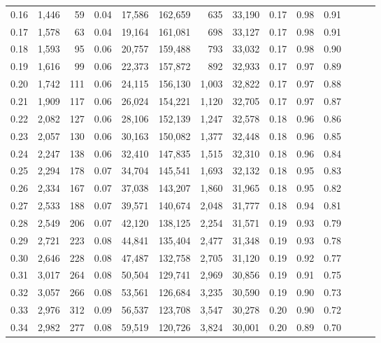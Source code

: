 \begin{tabular}{rrrrrrrrrrrrrr}
0.16 &  1,446 &   59 &  0.04 &   17,586 &  162,659 &     635 &  33,190 &  0.17 &  0.98 &      0.91 \\
0.17 &  1,578 &   63 &  0.04 &   19,164 &  161,081 &     698 &  33,127 &  0.17 &  0.98 &      0.91 \\
0.18 &  1,593 &   95 &  0.06 &   20,757 &  159,488 &     793 &  33,032 &  0.17 &  0.98 &      0.90 \\
0.19 &  1,616 &   99 &  0.06 &   22,373 &  157,872 &     892 &  32,933 &  0.17 &  0.97 &      0.89 \\
0.20 &  1,742 &  111 &  0.06 &   24,115 &  156,130 &   1,003 &  32,822 &  0.17 &  0.97 &      0.88 \\
0.21 &  1,909 &  117 &  0.06 &   26,024 &  154,221 &   1,120 &  32,705 &  0.17 &  0.97 &      0.87 \\
0.22 &  2,082 &  127 &  0.06 &   28,106 &  152,139 &   1,247 &  32,578 &  0.18 &  0.96 &      0.86 \\
0.23 &  2,057 &  130 &  0.06 &   30,163 &  150,082 &   1,377 &  32,448 &  0.18 &  0.96 &      0.85 \\
0.24 &  2,247 &  138 &  0.06 &   32,410 &  147,835 &   1,515 &  32,310 &  0.18 &  0.96 &      0.84 \\
0.25 &  2,294 &  178 &  0.07 &   34,704 &  145,541 &   1,693 &  32,132 &  0.18 &  0.95 &      0.83 \\
0.26 &  2,334 &  167 &  0.07 &   37,038 &  143,207 &   1,860 &  31,965 &  0.18 &  0.95 &      0.82 \\
0.27 &  2,533 &  188 &  0.07 &   39,571 &  140,674 &   2,048 &  31,777 &  0.18 &  0.94 &      0.81 \\
0.28 &  2,549 &  206 &  0.07 &   42,120 &  138,125 &   2,254 &  31,571 &  0.19 &  0.93 &      0.79 \\
0.29 &  2,721 &  223 &  0.08 &   44,841 &  135,404 &   2,477 &  31,348 &  0.19 &  0.93 &      0.78 \\
0.30 &  2,646 &  228 &  0.08 &   47,487 &  132,758 &   2,705 &  31,120 &  0.19 &  0.92 &      0.77 \\
0.31 &  3,017 &  264 &  0.08 &   50,504 &  129,741 &   2,969 &  30,856 &  0.19 &  0.91 &      0.75 \\
0.32 &  3,057 &  266 &  0.08 &   53,561 &  126,684 &   3,235 &  30,590 &  0.19 &  0.90 &      0.73 \\
0.33 &  2,976 &  312 &  0.09 &   56,537 &  123,708 &   3,547 &  30,278 &  0.20 &  0.90 &      0.72 \\
0.34 &  2,982 &  277 &  0.08 &   59,519 &  120,726 &   3,824 &  30,001 &  0.20 &  0.89 &      0.70 \\

\end{tabular}
